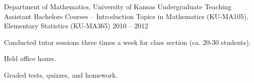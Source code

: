 \begin{cventries}
\cvteachentry
  	{Department of Mathematics, University of Kansas} %
  	{Undergraduate Teaching Assistant} %
    {Bachelors Courses -- Introduction Topics in Mathematics (KU-MA105), Elementary Statistics (KU-MA365)} %
    {2010 – 2012} %
    {
      \begin{cvitems} %
        \item Conducted tutor sessions three times a week for class section (ca. 20-30 students).
		\item Held office hours.
		\item Graded tests, quizzes, and homework.
      \end{cvitems}
    } %
    {} %
    {\showteachingdescriptions}

\end{cventries}
